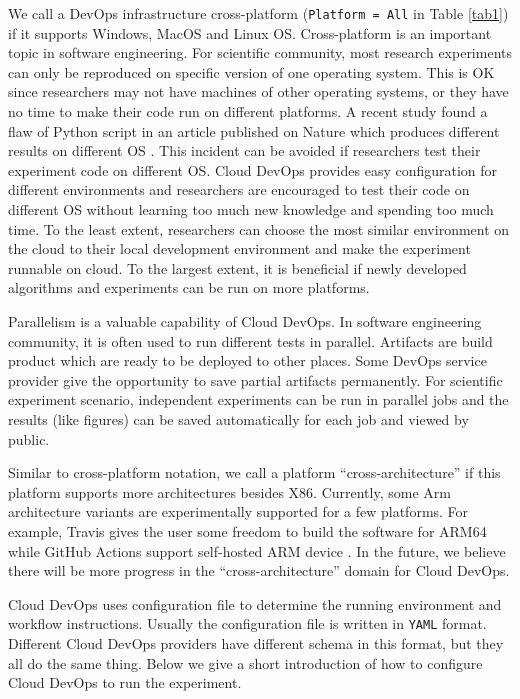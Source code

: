 \documentclass[10pt, conference, compsocconf]{IEEEtran}
\begin{document}
We call a DevOps infrastructure cross-platform (\texttt{Platform = All} in Table  \ref{tab1}) if it supports Windows, MacOS and Linux 
OS.
Cross-platform is an important topic in software engineering. For scientific community, most research experiments can only be reproduced on specific version of one operating system. This is OK since researchers may not have machines of other operating systems, or they have no time to make their code run on different platforms. A recent study found a flaw of Python script in an article published on Nature which produces different results on different OS \cite{bhandari2019characterization}. This incident can be avoided if researchers test their experiment code on different OS. Cloud DevOps provides easy configuration for different environments and researchers are encouraged to test their code on different OS without learning too much new knowledge and spending too much time. To the least extent, researchers can choose the most similar environment on the cloud to their local development environment and make the experiment runnable on cloud. To the largest extent, it is beneficial if newly developed algorithms and experiments can be run on more platforms.

Parallelism is a valuable capability of Cloud DevOps. In software engineering community, it is often used to run different tests in parallel.
Artifacts are build product which are ready to be deployed to other places.
Some DevOps service provider give the opportunity to save partial artifacts permanently. For scientific experiment scenario, independent experiments can be run in parallel jobs and the results (like figures) can be saved automatically for each job and viewed by public.

Similar to cross-platform notation, we call a platform ``cross-architecture'' if this platform supports more architectures besides X86. Currently, some Arm architecture variants are experimentally supported for a few platforms. For example, Travis gives the user some freedom to build the software
for ARM64 while GitHub Actions support self-hosted ARM device \cite{travis-arm, github-selfhosted}. In the future, we believe there will be more progress in the ``cross-architecture'' domain for Cloud DevOps. 

Cloud DevOps uses configuration file to determine the running environment and workflow instructions. 
Usually the configuration file is written in \texttt{YAML} format. Different Cloud DevOps providers have different schema in this format, but they all do the same thing. Below we give a short introduction of how to configure Cloud DevOps to run the experiment.
\end{document}
